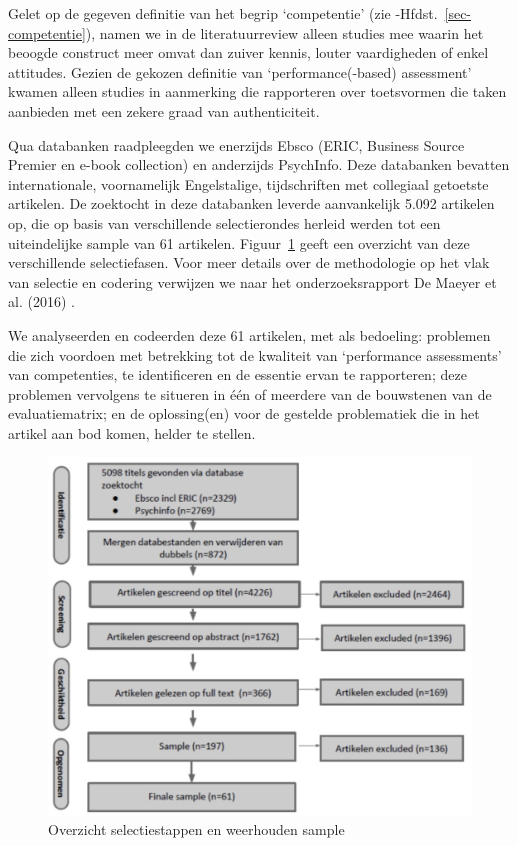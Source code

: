 \documentclass[
  letterpaper,
]{report}
\begin{document}
Gelet op de gegeven definitie van het begrip `competentie' (zie
-Hfdst.~\ref{sec-competentie}), namen we in de literatuurreview alleen
studies mee waarin het beoogde construct meer omvat dan zuiver kennis,
louter vaardigheden of enkel attitudes. Gezien de gekozen definitie van
`performance(-based) assessment' kwamen alleen studies in aanmerking die
rapporteren over toetsvormen die taken aanbieden met een zekere graad
van authenticiteit.

Qua databanken raadpleegden we enerzijds Ebsco (ERIC, Business Source
Premier en e-book collection) en anderzijds PsychInfo. Deze databanken
bevatten internationale, voornamelijk Engelstalige, tijdschriften met
collegiaal getoetste artikelen. De zoektocht in deze databanken leverde
aanvankelijk 5.092 artikelen op, die op basis van verschillende
selectierondes herleid werden tot een uiteindelijke sample van 61
artikelen. Figuur~\ref{fig-figuur3} geeft een overzicht van deze
verschillende selectiefasen. Voor meer details over de methodologie op
het vlak van selectie en codering verwijzen we naar het
onderzoeksrapport De Maeyer et al. (2016) .

We analyseerden en codeerden deze 61 artikelen, met als bedoeling:
problemen die zich voordoen met betrekking tot de kwaliteit van
`performance assessments' van competenties, te identificeren en de
essentie ervan te rapporteren; deze problemen vervolgens te situeren in
één of meerdere van de bouwstenen van de evaluatiematrix; en de
oplossing(en) voor de gestelde problematiek die in het artikel aan bod
komen, helder te stellen.

\begin{figure}

{\centering \includegraphics[width=5.20833in,height=\textheight]{./FIG3.jpg}

}

\caption{\label{fig-figuur3}Overzicht selectiestappen en weerhouden
sample}

\end{figure}
\end{document}
